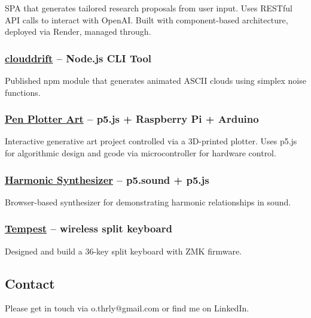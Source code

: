 \documentclass[11pt,a4paper]{article}
\begin{document}
SPA that generates tailored research proposals from user input. Uses
RESTful API calls to interact with OpenAI. Built with component-based
architecture, deployed via Render, managed through.

\subsubsection{\texorpdfstring{\href{https://github.com/thrly}{clouddrift}
-- Node.js CLI
Tool}{clouddrift -- Node.js CLI Tool}}\label{clouddrift-node.js-cli-tool}

Published npm module that generates animated ASCII clouds using simplex
noise functions.

\subsubsection{\texorpdfstring{\href{https://github.com/thrly}{Pen
Plotter Art} -- p5.js + Raspberry Pi +
Arduino}{Pen Plotter Art -- p5.js + Raspberry Pi + Arduino}}\label{pen-plotter-art-p5.js-raspberry-pi-arduino}

Interactive generative art project controlled via a 3D-printed plotter.
Uses p5.js for algorithmic design and gcode via microcontroller for
hardware control.

\subsubsection{\texorpdfstring{\href{https://github.com/thrly}{Harmonic
Synthesizer} -- p5.sound +
p5.js}{Harmonic Synthesizer -- p5.sound + p5.js}}\label{harmonic-synthesizer-p5.sound-p5.js}

Browser-based synthesizer for demonstrating harmonic relationships in
sound.

\subsubsection{\texorpdfstring{\href{https://github.com/thrly}{Tempest}
-- wireless split
keyboard}{Tempest -- wireless split keyboard}}\label{tempest-wireless-split-keyboard}

Designed and build a 36-key split keyboard with ZMK firmware.

\subsection{Contact}\label{contact}

Please get in touch via o.thrly@gmail.com or find me on LinkedIn.
\end{document}
